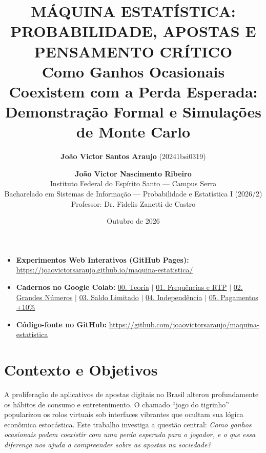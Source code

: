 \documentclass[10pt,a4paper]{article}
\title{\textbf{MÁQUINA ESTATÍSTICA: PROBABILIDADE, APOSTAS E PENSAMENTO CRÍTICO}\\
\large Como Ganhos Ocasionais Coexistem com a Perda Esperada: Demonstração Formal e Simulações de Monte Carlo}
\author{\textbf{João Victor Santos Araujo} (20241bsi0319) \and \textbf{João Victor Nascimento Ribeiro}\\
\small Instituto Federal do Espírito Santo — Campus Serra\\
\small Bacharelado em Sistemas de Informação — Probabilidade e Estatística I (2026/2)\\
\small Professor: Dr. Fidelis Zanetti de Castro}
\date{Outubro de 2026}
\begin{document}
\maketitle

\begin{tcolorbox}[colback=blue!5!white,colframe=blue!75!black,title=\textbf{Ambiente Experimental Online e Reprodutibilidade}]
\small
\begin{itemize}
    \item \textbf{Experimentos Web Interativos (GitHub Pages):} \url{https://joaovictorsaraujo.github.io/maquina-estatistica/}
    \item \textbf{Cadernos no Google Colab:}
    \href{https://colab.research.google.com/github/joaovictorsaraujo/maquina-estatistica/blob/master/notebooks/00_modelo_teorico.ipynb}{00. Teoria} $\mid$
    \href{https://colab.research.google.com/github/joaovictorsaraujo/maquina-estatistica/blob/master/notebooks/01_frequencias_rtp.ipynb}{01. Frequências e RTP} $\mid$
    \href{https://colab.research.google.com/github/joaovictorsaraujo/maquina-estatistica/blob/master/notebooks/02_convergencia_medias.ipynb}{02. Grandes Números} $\mid$
    \href{https://colab.research.google.com/github/joaovictorsaraujo/maquina-estatistica/blob/master/notebooks/03_simulacao_jogadores.ipynb}{03. Saldo Limitado} $\mid$
    \href{https://colab.research.google.com/github/joaovictorsaraujo/maquina-estatistica/blob/master/notebooks/04_independencia.ipynb}{04. Independência} $\mid$
    \href{https://colab.research.google.com/github/joaovictorsaraujo/maquina-estatistica/blob/master/notebooks/05_comparacao_pagamentos.ipynb}{05. Pagamentos +10\%}
    \item \textbf{Código-fonte no GitHub:} \url{https://github.com/joaovictorsaraujo/maquina-estatistica}
\end{itemize}
\end{tcolorbox}

\section{Contexto e Objetivos}
A proliferação de aplicativos de apostas digitais no Brasil alterou profundamente os hábitos de consumo e entretenimento. O chamado ``jogo do tigrinho'' popularizou os rolos virtuais sob interfaces vibrantes que ocultam sua lógica econômica estocástica. Este trabalho investiga a questão central: \textit{Como ganhos ocasionais podem coexistir com uma perda esperada para o jogador, e o que essa diferença nos ajuda a compreender sobre as apostas na sociedade?}
\end{document}
